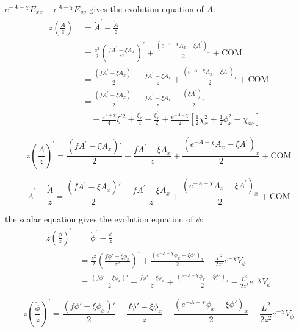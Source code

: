 \documentclass[12pt,a4paper]{ctexart}
\numberwithin{equation}{section}
\begin{document}
$e^{-A-\chi}E_{xx}-e^{A-\chi}E_{yy}$ gives the evolution equation of $A$:
\begin{equation}
    \begin{aligned}
        z(\frac{\dot{A}}{z})^{\prime}&=\dot{A}^{\prime}-\frac{\dot{A}}{z}\\
        &=\frac{z^{2}}{2}(\frac{fA^{\prime}-\xi A_{x}}{z^{2}})^{\prime}+\frac{(e^{-A-\chi}A_{x}-\xi A^{\prime})_{x}}{2}+\mathrm{COM}\\
        &=\frac{(fA^{\prime}-\xi A_{x})'}{2}-\frac{fA^{\prime}-\xi A_{x}}{z}+\frac{(e^{-A-\chi}A_{x}-\xi A^{\prime})_{x}}{2}+\mathrm{COM}\\
        &=\frac{(fA^{\prime}-\xi A_{x})'}{2}-\frac{fA^{\prime}-\xi A_{x}}{z}-\frac{(\xi A^{\prime})_{x}}{2}\\
        &\quad+\frac{e^{A+\chi}}{4}\xi^{\prime2}+\frac{\xi_{x}}{z}-\frac{\xi_{x}^{\prime}}{2}+\frac{e^{-A-\chi}}{2}[\frac{1}{2}\chi_{x}^2+\frac{1}{2}\phi_x^2-\chi_{xx}]
    \end{aligned}
\end{equation}

\begin{equation}
    z(\frac{\dot{A}}{z})^{\prime}=\frac{(fA^{\prime}-\xi A_{x})'}{2}-\frac{fA^{\prime}-\xi A_{x}}{z}+\frac{(e^{-A-\chi}A_{x}-\xi A^{\prime})_{x}}{2}+\mathrm{COM}
\end{equation}

\begin{equation}
    \dot{A}^{\prime}-\frac{\dot{A}}{z}=\frac{(fA^{\prime}-\xi A_{x})'}{2}-\frac{fA^{\prime}-\xi A_{x}}{z}+\frac{(e^{-A-\chi}A_{x}-\xi A^{\prime})_{x}}{2}+\mathrm{COM}
\end{equation}

the scalar equation gives the evolution equation of $\phi$:
\begin{equation}
    \begin{aligned}
        z(\frac{\dot{\phi}}{z})^{\prime}&=\dot{\phi}^{\prime}-\frac{\dot{\phi}}{z}\\
        &=\frac{z^{2}}{2}(\frac{f\phi'-\xi\phi_{x}}{z^{2}})^{\prime}+\frac{(e^{-A-\chi}\phi_{x}-\xi\phi')_{x}}{2}-\frac{L^{2}}{2z^{2}}e^{-\chi}V_\phi\\
        &=\frac{(f\phi'-\xi\phi_{x})'}{2}-\frac{f\phi'-\xi\phi_{x}}{z}+\frac{(e^{-A-\chi}\phi_{x}-\xi\phi')_{x}}{2}-\frac{L^{2}}{2z^{2}}e^{-\chi}V_\phi
    \end{aligned}
\end{equation}

\begin{equation}
    z(\frac{\dot{\phi}}{z})^{\prime}=\frac{(f\phi'-\xi\phi_{x})'}{2}-\frac{f\phi'-\xi\phi_{x}}{z}+\frac{(e^{-A-\chi}\phi_{x}-\xi\phi')_{x}}{2}-\frac{L^{2}}{2z^{2}}e^{-\chi}V_\phi
\end{equation}
\end{document}
